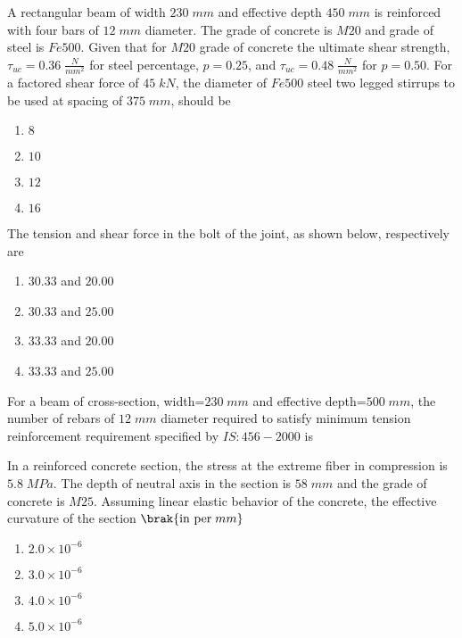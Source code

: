 \item A rectangular beam of width  $230\;mm$ and effective depth  $450\;mm$ is reinforced with four bars of $12\;mm$ diameter. The grade of concrete is $M20$ and grade of steel is $Fe500$. Given that for $M20$ grade of concrete the ultimate shear strength, $\tau_{uc}=0.36\;\frac{N}{mm^2}$ for steel percentage, $p=0.25$, and $\tau_{uc}=0.48\;\frac{N}{mm^2}$ for $p=0.50$. For a factored shear force of $45\;kN$, the diameter  of $Fe500$ steel two legged stirrups to be used at spacing of $375\;mm$, should be
\begin{enumerate}
    \item $8$
    \item $10$
    \item $12$
    \item $16$
\end{enumerate}
\item The tension and shear force  in the bolt of the joint, as shown below, respectively are
	
\begin{enumerate}
    \item $30.33$ and $20.00$
    \item $30.33$ and $25.00$
    \item $33.33$ and $20.00$
    \item $33.33$ and $25.00$
\end{enumerate}
\item For a beam of cross-section, width=$230\;mm$ and effective depth=$500\;mm$, the number of rebars of $12\;mm$ diameter required to satisfy 
minimum tension reinforcement requirement specified by $IS:456-2000$  is \underline{\hspace{2cm}}
\item In a reinforced concrete section, the stress at the extreme fiber in compression is $5.8\;MPa$. The depth of neutral axis in the section is $58\;mm$ and the grade of concrete is $M25$. Assuming linear elastic behavior of the concrete, the effective curvature of the section $\brak{\text{in per}\;mm} $
\begin{enumerate}
    \item $2.0 \times 10^{-6}$
    \item $3.0 \times 10^{-6}$
    \item $4.0 \times 10^{-6}$
    \item $5.0 \times 10^{-6}$
\end{enumerate}

